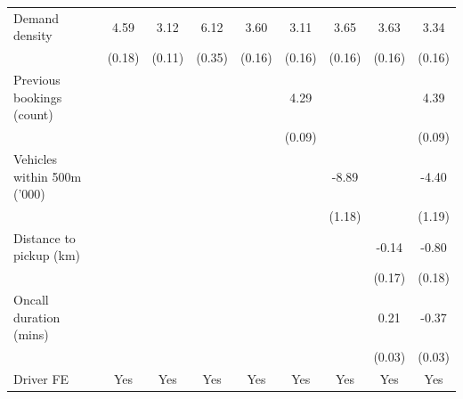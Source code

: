 \documentclass[reviewmode]{restat}
\begin{document}
\begin{appendices}
\begin{table}
{\begin{tabular}{l*{8}{S}}
            \addlinespace
            Demand density      &       4.59&       3.12&       6.12&       3.60&       3.11&       3.65&       3.63&       3.34\\
                                &     (0.18)         &     (0.11)         &     (0.35)         &     (0.16)         &     (0.16)         &     (0.16)         &     (0.16)         &     (0.16)         \\
            \addlinespace
            Previous bookings (count)&                     &                     &                     &                     &       4.29&                     &                     &       4.39\\
                                &                     &                     &                     &                     &     (0.09)         &                     &                     &     (0.09)         \\
            \addlinespace
            Vehicles within 500m ('000)&                     &                     &                     &                     &                     &      -8.89&                     &      -4.40\\
                                &                     &                     &                     &                     &                     &     (1.18)         &                     &     (1.19)         \\
            \addlinespace
            Distance to pickup (km)&                     &                     &                     &                     &                     &                     &      -0.14         &      -0.80\\
                                &                     &                     &                     &                     &                     &                     &     (0.17)         &     (0.18)         \\
            \addlinespace
            Oncall duration (mins)&                     &                     &                     &                     &                     &                     &       0.21&      -0.37\\
                                &                     &                     &                     &                     &                     &                     &     (0.03)         &     (0.03)         \\
            \addlinespace
            Driver FE           &       {Yes}         &       {Yes}         &       {Yes}         &       {Yes}         &       {Yes}         &       {Yes}         &       {Yes}         &       {Yes}         \\

\end{tabular}}
\end{table}
\end{appendices}
\end{document}
